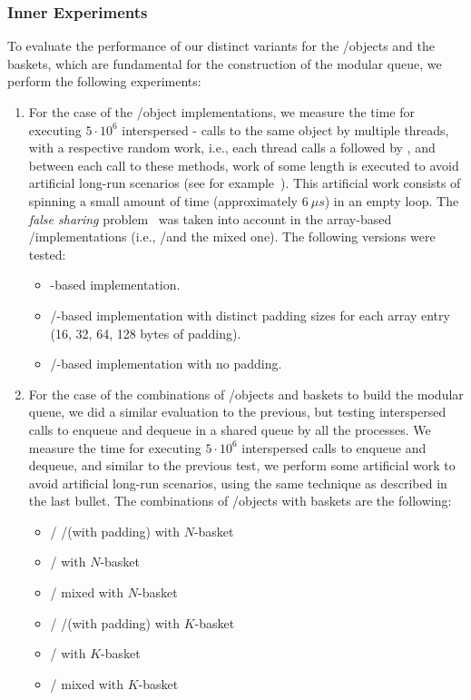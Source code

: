 \subsubsection{\label{subsubsec:queue-experiments-inner-experiments}Inner Experiments}

To evaluate the performance of our distinct variants for the \LL/\IC objects and the baskets, which are fundamental for the construction of the modular queue, we perform the following experiments:

\begin{enumerate}
    \item For the case of the \LL/\IC object implementations, we measure the time for executing \(5 \cdot 10^6\) interspersed \LL - \IC calls to the same object by multiple threads, with a respective random work, i.e., each thread calls a \LL followed by \IC, and between each call to these methods, work of some length is executed to avoid artificial long-run scenarios (see for example~\cite{DBLP_conf_ppopp_YangM16}). This artificial work consists of spinning a small amount of time (approximately \(6\ \mu{}s\)) in an empty loop. The \emph{false sharing} problem~\cite{BoloskyMichael93} was taken into account in the array-based \LL/\IC implementations (i.e., \R/\W and the mixed one). The following versions were tested:

    \begin{itemize}
        \item \CAS-based implementation.
        \item \R/\W-based implementation with distinct padding sizes for each array entry (16, 32, 64, 128 bytes of padding).
        \item \R/\W-based implementation with no padding.
    \end{itemize}

    \item For the case of the combinations of \LL/\IC objects and baskets to build the modular queue, we did a similar evaluation to the previous, but testing interspersed calls to enqueue and dequeue in a shared queue by all the processes. We measure the time for executing \(5\cdot 10^6\) interspersed calls to enqueue and dequeue, and similar to the previous test, we perform some artificial work to avoid artificial long-run scenarios, using the same technique as described in the last bullet. The combinations of \LL/\IC objects with baskets are the following:
    \begin{itemize}
        \item \LL/\IC{} \R/\W (with padding) with \(N\)-basket
        \item \LL/\IC{} \CAS with \(N\)-basket
        \item \LL/\IC{} mixed with \(N\)-basket
        \item \LL/\IC{} \R/\W (with padding) with \(K\)-basket
        \item \LL/\IC{} \CAS with \(K\)-basket
        \item \LL/\IC{} mixed with \(K\)-basket
    \end{itemize}
\end{enumerate}



